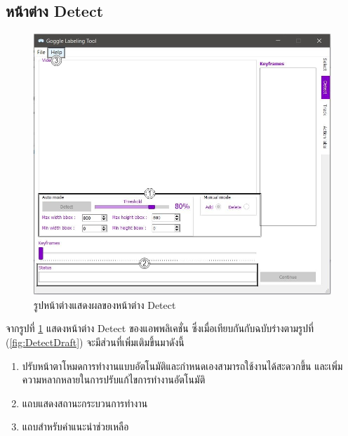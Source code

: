\subsection*{หน้าต่าง Detect}
\begin{figure}[!ht]
  \centering
    \includegraphics[scale=0.4]{chapter4/images/Final_ui/Detect.jpg}
    \caption{รูปหน้าต่างแสดงผลของหน้าต่าง Detect}
    \label{fig:final_detect}
\end{figure}
จากรูปที่ \ref{fig:final_detect} แสดงหน้าต่าง Detect ของแอพพลิเคชั่น ซึ่งเมื่อเทียบกันกับฉบับร่างตามรูปที่ (\ref{fig:DetectDraft}) จะมีส่วนที่เพิ่มเติมขึ้นมาดังนี้
\begin{enumerate}
	\item ปรับหน้าตาโหมดการทำงานแบบอัตโนมัติและกำหนดเองสามารถใช้งานได้สะดวกขึ้น และเพิ่มความหลากหลายในการปรับแก้ไขการทำงานอัตโนมัติ
	\item แถบแสดงสถานะกระบวนการทำงาน
	\item แถบสำหรับคำแนะนำช่วยเหลือ
\end{enumerate}		

\clearpage
